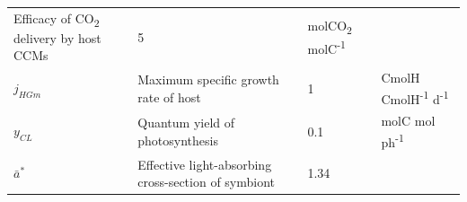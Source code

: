 \documentclass[]{elsarticle} %
\begin{document}
\begin{longtable}[c]{@{}llll@{}}
\begin{minipage}[t]{0.48\columnwidth}
Efficacy of CO\textsubscript{2} delivery by host CCMs
\strut\end{minipage} &
\begin{minipage}[t]{0.09\columnwidth}\raggedright\strut
5
\strut\end{minipage} &
\begin{minipage}[t]{0.23\columnwidth}\raggedright\strut
molCO\textsubscript{2} molC\textsuperscript{-1}
\strut\end{minipage}\tabularnewline
\begin{minipage}[t]{0.10\columnwidth}\raggedright\strut
\(j_{HGm}\)
\strut\end{minipage} &
\begin{minipage}[t]{0.48\columnwidth}\raggedright\strut
Maximum specific growth rate of host
\strut\end{minipage} &
\begin{minipage}[t]{0.09\columnwidth}\raggedright\strut
1
\strut\end{minipage} &
\begin{minipage}[t]{0.23\columnwidth}\raggedright\strut
CmolH CmolH\textsuperscript{-1} d\textsuperscript{-1}
\strut\end{minipage}\tabularnewline
\begin{minipage}[t]{0.10\columnwidth}\raggedright\strut
\(y_{CL}\)
\strut\end{minipage} &
\begin{minipage}[t]{0.48\columnwidth}\raggedright\strut
Quantum yield of photosynthesis
\strut\end{minipage} &
\begin{minipage}[t]{0.09\columnwidth}\raggedright\strut
0.1
\strut\end{minipage} &
\begin{minipage}[t]{0.23\columnwidth}\raggedright\strut
molC mol ph\textsuperscript{-1}
\strut\end{minipage}\tabularnewline
\begin{minipage}[t]{0.10\columnwidth}\raggedright\strut
\(\bar{a}^*\)
\strut\end{minipage} &
\begin{minipage}[t]{0.48\columnwidth}\raggedright\strut
Effective light-absorbing cross-section of symbiont
\strut\end{minipage} &
\begin{minipage}[t]{0.09\columnwidth}\raggedright\strut
1.34
\strut\end{minipage} &
\begin{minipage}[t]{0.23\columnwidth}\raggedright\strut

\end{minipage}
\end{longtable}
\end{document}

